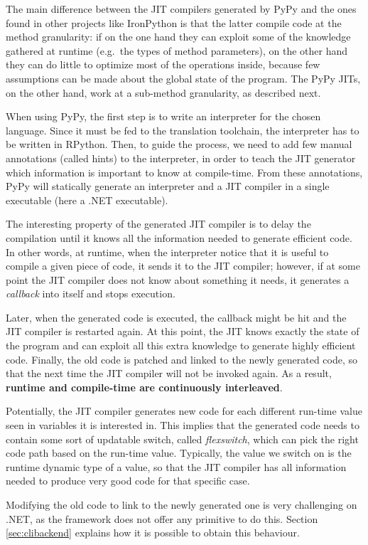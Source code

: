 The main difference between the JIT compilers generated by PyPy and the
ones found in other projects like IronPython is that the latter compile
code at the method granularity: if on the one hand they can exploit
some of the knowledge gathered at runtime  (e.g.\ the types of method
parameters), on the other hand they can do little to optimize most of
the operations inside, because few assumptions can be made about the
global state of the program.  The PyPy JITs, on the other hand, work at
a sub-method granularity, as described next.

When using PyPy, the first step is to write an interpreter for the chosen language.  Since it
must be fed to the translation toolchain, the interpreter has to be written in
RPython.  Then, to guide the process, we need to add few manual
annotations (called hints) to the interpreter, in order to teach the JIT generator which
information is important to know at compile-time.  
From these annotations, PyPy will statically generate an interpreter and a JIT
compiler in a single executable (here a .NET executable).

The interesting property of the generated JIT compiler is to delay the
compilation until it knows all the information needed to generate
efficient code.  In other words, at runtime, when the interpreter notice
that it is useful to compile a given piece of code, it sends it to the
JIT compiler; however, if at some point the JIT compiler does not know
about something it needs, it generates a \emph{callback} into itself and stops
execution.

Later, when the generated code is executed, the callback might be hit and the JIT
compiler is restarted again.  At this point, the JIT knows exactly the state
of the program and can exploit all this extra knowledge to generate highly
efficient code.  Finally, the old code is patched and linked to the newly
generated code, so that the next time the JIT compiler will not be invoked
again.  As a result, \textbf{runtime and compile-time are continuously
interleaved}. 

Potentially, the JIT compiler generates new code for each different run-time
value seen in variables it is interested in.
This implies that the generated code needs to contain some sort of updatable
switch, called \emph{flexswitch}, which can pick the right code path based on the
run-time value.  Typically, the value we switch on is the runtime dynamic type
of a value, so that the JIT compiler has all information needed to produce
very good code for that specific case.

Modifying the old code to link to the newly generated one is very challenging on
.NET, as the framework does not offer any primitive to do this.  Section
\ref{sec:clibackend} explains how it is possible to obtain this behaviour.
